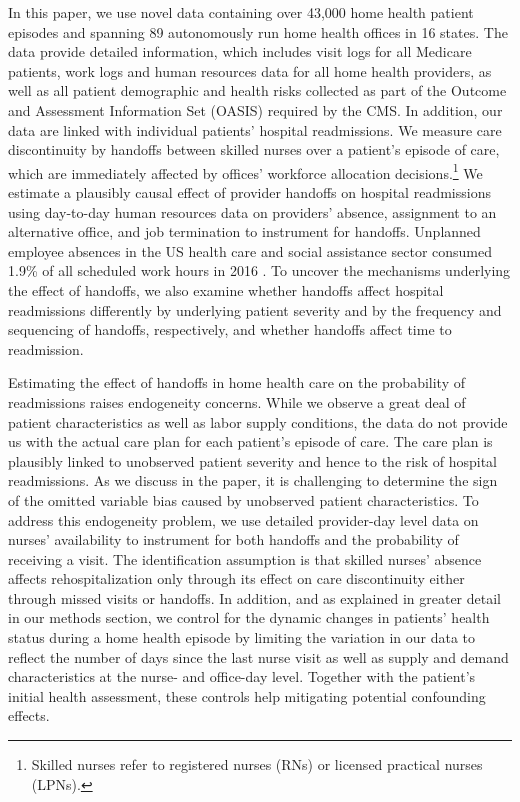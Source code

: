 \documentclass[final,12pt, notitlepage]{article}
\begin{document}
In this paper, we use novel data containing over 43,000 home health patient episodes and spanning 89 autonomously run home health offices in 16 states. The data provide detailed information, which includes visit logs for all Medicare patients, work logs and human resources data for all home health providers, as well as all patient demographic and health risks collected as part of the Outcome and Assessment Information Set (OASIS) required by the CMS.
In addition, our data are linked with individual patients' hospital readmissions.
We measure care discontinuity by handoffs between skilled nurses over a patient's episode of care, which are immediately affected by offices' workforce allocation decisions.\footnote{Skilled nurses refer to registered nurses (RNs) or licensed practical nurses (LPNs).
}
We estimate a plausibly causal effect of provider handoffs on hospital readmissions using day-to-day human resources data on providers' absence, assignment to an alternative office, and job termination to instrument for handoffs.
Unplanned employee absences in the US health care and social assistance sector consumed 1.9\% of all scheduled work hours in 2016 \citep{BLS2017}.
To uncover the mechanisms underlying the effect of handoffs, we also examine whether handoffs affect hospital readmissions differently by underlying patient severity and by the frequency and sequencing of handoffs, respectively, and whether handoffs affect time to readmission.


Estimating the effect of handoffs in home health care on the probability of readmissions raises endogeneity concerns.
While we observe a great deal of patient characteristics as well as labor supply conditions, the data do not provide us with the actual care plan for each patient's episode of care. The care plan is plausibly linked to unobserved patient severity and hence to the risk of hospital readmissions. As we discuss in the paper, it is challenging to determine the sign of the omitted variable bias caused by unobserved patient characteristics.
To address this endogeneity problem, we use detailed provider-day level data on nurses' availability to instrument for both handoffs and the probability of receiving a visit. The identification assumption is that skilled nurses' absence affects rehospitalization only through its effect on care discontinuity either through missed visits or handoffs. In addition, and as explained in greater detail in our methods section, we control for the dynamic changes in patients' health status during a home health episode by limiting the variation in our data to reflect the number of days since the last nurse visit as well as supply and demand characteristics at the nurse- and office-day level. Together with the patient's initial health assessment, these controls help mitigating potential confounding effects.
\end{document}
